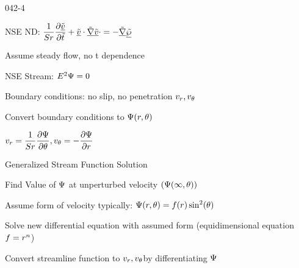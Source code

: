\begin{mitframe}{042-4}
            
\begin{listone}
\item NSE ND: $ \dfrac{1}{\strouhal}\dfrac{\partial\uline{\tilde{\vvel}}}{\partial\tilde{t}}+\uline{\tilde{\vvel}}\cdot\tilde{\gradop}\uline{\tilde{\vvel}}\cdot=-\tilde{\gradop}\uline{\tilde{\dynpress}}$
			\begin{listtwo}
			\item Assume steady flow, no t dependence
            \end{listtwo}
\item NSE Stream: $\energy^2\streamfunc=0$
\item Boundary conditions: no slip, no penetration $\vvel_{\pos}, \vvel_{\theta}$
\item Convert boundary conditions to $\streamfunc(\pos,\theta)$
			\begin{listtwo}
            \item $\vvel_{\pos}=\dfrac{1}{\strouhal}\dfrac{\partial\streamfunc}{\partial\theta}, \vvel_{\theta}=-\dfrac{\partial\streamfunc}{\partial\pos}$
            \end{listtwo}
\item Generalized Stream Function Solution
			\begin{listtwo}
            \item Find Value of $\streamfunc$ at unperturbed velocity $(\streamfunc(\infty,\theta))$
            \item Assume form of velocity typically: 
          $\streamfunc(\pos,\theta)=\fug(\pos)\sin^2(\theta)$
        	\item Solve new differential equation with assumed form 
            (equidimensional equation $\fug=\pos^n$)
            \end{listtwo}
Convert streamline function to $\vvel_{\pos}, \vvel_{\theta}$by differentiating $\streamfunc$

\end{listone}
\end{mitframe}